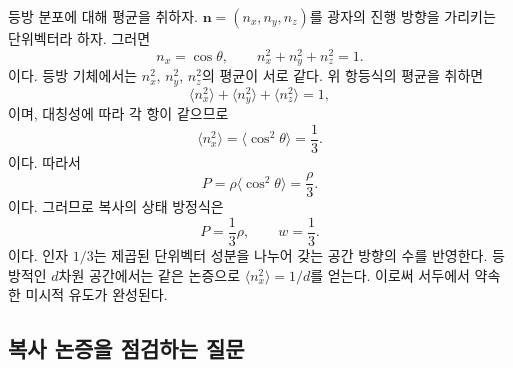 등방 분포에 대해 평균을 취하자. \(\mathbf n=(n_x,n_y,n_z)\)를 광자의 진행 방향을 가리키는 단위벡터라 하자. 그러면
\begin{equation}
n_x=\cos\theta,
\qquad
n_x^2+n_y^2+n_z^2=1.
\end{equation}
이다. 등방 기체에서는 \(n_x^2\), \(n_y^2\), \(n_z^2\)의 평균이 서로 같다. 위 항등식의 평균을 취하면
\begin{equation}
\langle n_x^2\rangle+\langle n_y^2\rangle+\langle n_z^2\rangle=1,
\end{equation}
이며, 대칭성에 따라 각 항이 같으므로
\begin{equation}
\langle n_x^2\rangle=\langle \cos^2\theta\rangle=\frac13.
\end{equation}
이다. 따라서
\begin{equation}
P=\rho\langle \cos^2\theta\rangle=\frac{\rho}{3}.
\end{equation}
이다. 그러므로 복사의 상태 방정식은
\begin{equation}
P=\frac13\rho,
\qquad
w=\frac13.
\end{equation}
이다. 인자 \(1/3\)는 제곱된 단위벡터 성분을 나누어 갖는 공간 방향의 수를 반영한다. 등방적인 \(d\)차원 공간에서는 같은 논증으로 \(\langle n_x^2\rangle=1/d\)를 얻는다. 이로써 서두에서 약속한 미시적 유도가 완성된다.

\subsection{복사 논증을 점검하는 질문}

\begin{classroomqa}
\end{classroomqa}

\begin{classroomqa}
\end{classroomqa}

